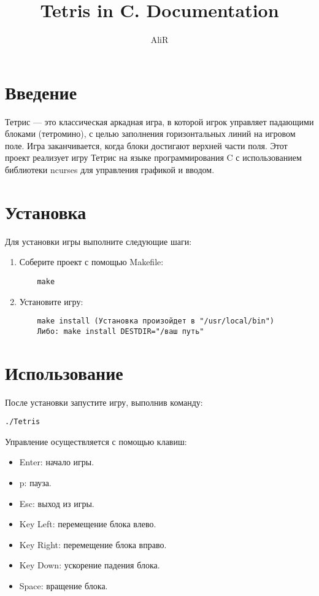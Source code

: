 \documentclass{article}
\title{Tetris in C. Documentation}
\author{AliR}
\begin{document}
\maketitle

\section{Введение}
Тетрис — это классическая аркадная игра, в которой игрок управляет падающими блоками (тетромино), с целью заполнения горизонтальных линий на игровом поле. Игра заканчивается, когда блоки достигают верхней части поля. Этот проект реализует игру Тетрис на языке программирования C с использованием библиотеки ncurses для управления графикой и вводом.

\section{Установка}
Для установки игры выполните следующие шаги:
\begin{enumerate}
    \item Соберите проект с помощью Makefile:
    \begin{verbatim}
    make
    \end{verbatim}
    \item Установите игру:
    \begin{verbatim}
    make install (Установка произойдет в "/usr/local/bin")
    Либо: make install DESTDIR="/ваш путь"
    \end{verbatim}
\end{enumerate}

\section{Использование}
После установки запустите игру, выполнив команду:
\begin{verbatim}
./Tetris
\end{verbatim}
Управление осуществляется с помощью клавиш:
\begin{itemize}
    \item Enter: начало игры.
    \item p: пауза.
    \item Esc: выход из игры.
    \item Key Left: перемещение блока влево.
    \item Key Right: перемещение блока вправо.
    \item Key Down: ускорение падения блока.
    \item Space: вращение блока.
\end{itemize}
\end{document}
